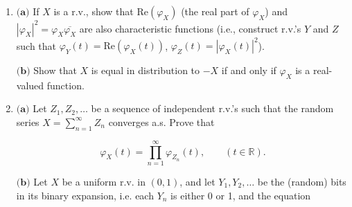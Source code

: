 \documentclass[11pt]{report}
\newcommand{\R}{\mathbb{R}}
\theoremstyle{plain}
\theoremstyle{definition}
\begin{document}
\begin{enumerate}[label=\arabic*.]
\begin{enumerate}[label=(\alph*)]
\item $\textbf{Poisson distribution:}$$X\sim \textrm{Poisson}(\lambda)$.

\item $\textbf{Geometric distribution:}$$X\sim \textrm{Geom}(p)$ (assume a geometric that
starts at 1).

\item $\textbf{Uniform distribution:}$$X \sim U[a,b]$, and
in particular $X\sim [-1,1]$ which is especially
symmetric and useful in applications.

\item $\textbf{Exponential distribution:}$$X\sim \textrm{Exp}(\lambda)$.

\item $\textbf{Symmetrized exponential:}$ A r.v. $Z$ with
density function $f_Z(x) = \frac12 e^{-|x|}$. Note
that this is the distribution of the exponential
distribution after being ``symmetrized'' in either of
two ways: (i) We showed that if
$X,Y\sim \textrm{Exp}(1)$ are independent then $X-Y$
has density $\frac12 e^{-|x|}$; (ii) alternatively,
it is the distribution of an ``exponential variable
with random sign'', namely $\varepsilon\cdot X$ where
$X\sim \textrm{Exp}(1)$ and $\varepsilon$ is a random
sign (same as the coin flip distribution mentioned
above) that is independent of $X$.
\end{enumerate}

\item $\textbf{(a)}$ If $X$ is a r.v., show that
$\textrm{Re}(\varphi_X)$ (the real part of
$\varphi_X$) and
$|\varphi_X|^2 = \varphi_X \overline{\varphi_X}$ are
also characteristic functions (i.e., construct r.v.'s
$Y$ and $Z$ such that
$\varphi_Y(t) = \textrm{Re}(\varphi_X(t))$,
$\varphi_Z(t) = |\varphi_X(t)|^2$).

$\textbf{(b)}$ Show that $X$ is equal in distribution
to $-X$ if and only if $\varphi_X$ is a real-valued
function.

\item $\textbf{(a)}$ Let $Z_1,Z_2,\ldots$ be a sequence of
independent r.v.'s such that the random series
$X = \sum_{n=1}^\infty Z_n$ converges a.s. Prove that

\[
\varphi_X(t) = \prod_{n=1}^\infty \varphi_{Z_n}(t), \qquad (t\in \R).
\]

\noindent $\textbf{(b)}$ Let $X$ be a uniform r.v. in $(0,1)$,
and let $Y_1, Y_2, \ldots$ be the (random) bits in
its binary expansion, i.e. each $Y_n$ is either 0 or
1, and the equation


\end{enumerate}
\end{document}

